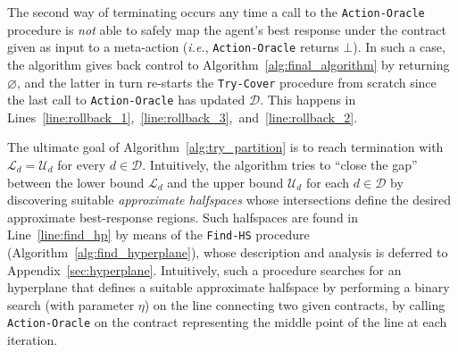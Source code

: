 %
The second way of terminating occurs any time a call to the \texttt{Action-Oracle} procedure is \emph{not} able to safely map the agent's best response under the contract given as input to a meta-action (\emph{i.e.}, \texttt{Action-Oracle} returns $\bot$).
%
In such a case, the algorithm gives back control to Algorithm~\ref{alg:final_algorithm} by returning $\varnothing$, and the latter in turn re-starts the \texttt{Try-Cover} procedure from scratch since the last call to \texttt{Action-Oracle} has updated $\mathcal{D}$.
%
This happens in Lines~\ref{line:rollback_1},~\ref{line:rollback_3},~and~\ref{line:rollback_2}.
%

The ultimate goal of Algorithm~\ref{alg:try_partition} is to reach termination with $\mathcal{L}_{d} = \mathcal{U}_{d}$ for every $d \in \mathcal{D}$.
%
Intuitively, the algorithm tries to ``close the gap'' between the lower bound $\mathcal{L}_{d} $ and the upper bound $ \mathcal{U}_{d}$ for each $d \in \mathcal{D}$ by discovering suitable \emph{approximate halfspaces} whose intersections define the desired approximate best-response regions.  
%
%
Such halfspaces are found in Line~\ref{line:find_hp} by means of the \texttt{Find-HS} procedure (Algorithm~\ref{alg:find_hyperplane}), whose description and analysis is deferred to Appendix~\ref{sec:hyperplane}.
%
Intuitively, such a procedure searches for an hyperplane that defines a suitable approximate halfspace by performing a binary search (with parameter $\eta$) on the line connecting two given contracts, by calling \texttt{Action-Oracle} on the contract representing the middle point of the line at each iteration.
%
%
%



